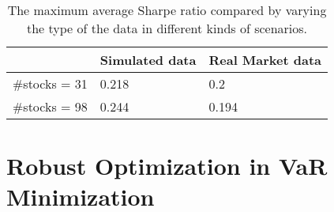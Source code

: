 \begin{table}[!h]
    \centering
    \captionsetup{justification=centering}
   \begin{tabular}{||p{4cm}|p{4cm}|p{4cm}||}
   \hline
  & Simulated data & Real Market data \\
  \hline
  \#stocks = 31  & 0.218    &0.2\\
 \#stocks = 98 &   0.244  & 0.194  \\
 \hline
\end{tabular}
    \caption{The maximum average Sharpe ratio compared by varying the type of the data in different kinds of scenarios.}
    \label{tab:data_type}
\end{table}

\section{Robust Optimization in VaR Minimization}

